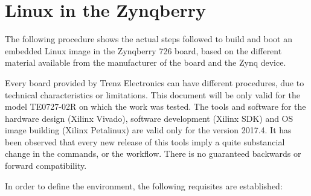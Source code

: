 %  
%  
%  
%  
%  
%  

\chapter{Linux in the Zynqberry} \label{appen1}

The following procedure shows the actual steps followed to build and boot an embedded Linux image
in the Zynqberry 726 board, based on the different material available from the manufacturer of the
board and the Zynq device.

Every board provided by Trenz Electronics can have different procedures, due to technical
characteristics or limitations. This document will be only valid for the model TE0727-02R on which
the work was tested. The tools and software for the hardware design (Xilinx Vivado), software
development (Xilinx SDK) and OS image building (Xilinx Petalinux) are valid only for the version
2017.4. It has been observed that every new release of this tools imply a quite substancial change
in the commands, or the workflow. There is no guaranteed backwards or forward compatibility.

In order to define the environment, the following requisites are established:


